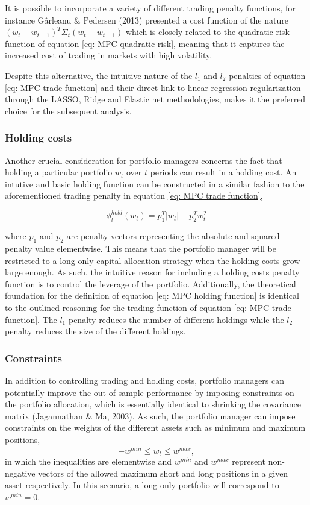 It is possible to incorporate a variety of different trading penalty functions, for instance Gârleanu \& Pedersen (2013) presented a cost function of the nature $(w_t-w_{t-1})^T\Sigma_t(w_t-w_{t-1})$ which is closely related to the quadratic risk function of equation \ref{eq: MPC quadratic risk}, meaning that it captures the increased cost of trading in markets with high volatility.

Despite this alternative, the intuitive nature of the $l_1$ and $l_2$ penalties of equation \ref{eq: MPC trade function} and their direct link to linear regression regularization through the LASSO, Ridge and Elastic net methodologies, makes it the preferred choice for the subsequent analysis.

\subsubsection{Holding costs}
Another crucial consideration for portfolio managers concerns the fact that holding a particular portfolio $w_t$ over $t$ periods can result in a holding cost. An intutive and basic holding function can be constructed in a similar fashion to the aforementioned trading penalty in equation \ref{eq: MPC trade function},

\begin{equation}
    \phi_t^{hold}(w_t) = p_1^T|w_t| + p_2^Tw_t^2
    \label{eq: MPC holding function}
\end{equation}

where $p_1$ and $p_2$ are penalty vectors representing the absolute and squared penalty value elementwise. This means that the portfolio manager will be restricted to a long-only capital allocation strategy when the holding costs grow large enough. As such, the intuitive reason for including a holding costs penalty function is to control the leverage of the portfolio. Additionally, the theoretical foundation for the definition of equation \ref{eq: MPC holding function} is identical to the outlined reasoning for the trading function of equation \ref{eq: MPC trade function}. The $l_1$ penalty reduces the number of different holdings while the $l_2$ penalty reduces the size of the different holdings.

\subsubsection{Constraints}
In addition to controlling trading and holding costs, portfolio managers can potentially improve the out-of-sample performance by imposing constraints on the portfolio allocation, which is essentially identical to shrinking the covariance matrix (Jagannathan \& Ma, 2003). As such, the portfolio manager can impose constraints on the weights of the different assets such as minimum and maximum positions,
\begin{equation}
    -w^{min}\leq w_t\leq w^{max},
\end{equation}
in which the inequalities are elementwise and $w^{min}$ and $w^{max}$ represent non-negative vectors of the allowed maximum short and long positions in a given asset respectively. In this scenario, a long-only portfolio will correspond to $w^{min}=0$.

